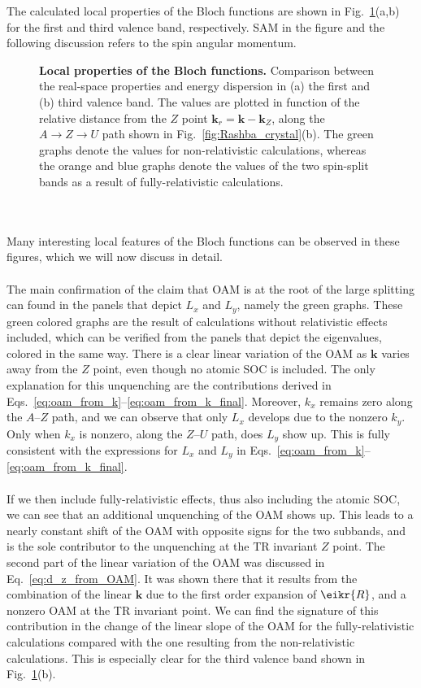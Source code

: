 The calculated local properties of the Bloch functions are shown in Fig.~\ref{fig:Rashba_oamvseigvalv}(a,b) for the first and third valence band, respectively. SAM in the figure and the following discussion refers to the spin angular momentum.
\begin{figure}[h!]
	\centering
{}
\caption{\label{fig:Rashba_oamvseigvalv}{\bf Local properties of the Bloch functions.} Comparison between the real-space properties and energy dispersion in (a) the first and (b) third valence band. The values are plotted in function of the relative distance from the $Z$ point $\bm{k}_r = \bm{k} - \bm{k}_Z$, along the $A \rightarrow Z \rightarrow U$ path shown in Fig.~\ref{fig:Rashba_crystal}(b). The green graphs denote the values for non-relativistic calculations, whereas the orange and blue graphs denote the values of the two spin-split bands as a result of fully-relativistic calculations.}
\end{figure}
\\\\
Many interesting local features of the Bloch functions can be observed in these figures, which we will now discuss in detail.
\\\\
The main confirmation of the claim that OAM is at the root of the large splitting can found in the panels that depict $L_x$ and $L_y$, namely the green graphs. These green colored graphs are the result of calculations without relativistic effects included, which can be verified from the panels that depict the eigenvalues, colored in the same way.
There is a clear linear variation of the OAM as $\bm k$ varies away from the $Z$ point, even though no atomic SOC is included.
The only explanation for this unquenching are the contributions derived in Eqs.~\eqref{eq:oam_from_k}--\eqref{eq:oam_from_k_final}.
Moreover, $k_x$ remains zero along the $A$--$Z$ path, and we can observe that only $L_x$ develops due to the nonzero $k_y$. Only when $k_x$ is nonzero, along the $Z$--$U$ path, does $L_y$ show up. This is fully consistent with the expressions for $L_x$ and $L_y$ in Eqs.~\eqref{eq:oam_from_k}--\eqref{eq:oam_from_k_final}.
\\\\
If we then include fully-relativistic effects, thus also including the atomic SOC, we can see that an additional unquenching of the OAM shows up.
This leads to a nearly constant shift of the OAM with opposite signs for the two subbands, and is the sole contributor to the unquenching at the TR invariant $Z$ point.
The second part of the linear variation of the OAM was discussed in Eq.~\eqref{eq:d_z_from_OAM}. It was shown there that it results from the combination of the linear $\bm k$ due to the first order expansion of $\eikr{R}$, and a nonzero OAM at the TR invariant point.
We can find the signature of this contribution in the change of the linear slope of the OAM for the fully-relativistic calculations compared with the one resulting from the non-relativistic calculations.
This is especially clear for the third valence band shown in Fig.~\ref{fig:Rashba_oamvseigvalv}(b).

